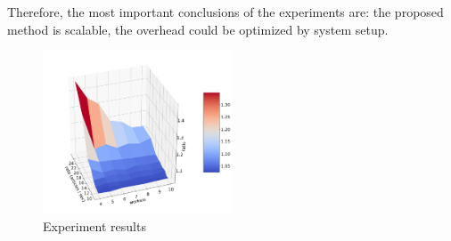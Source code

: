 Therefore, the most important conclusions of the experiments are: the proposed method is scalable, the overhead could be optimized by system setup.

\begin{figure}[htbp]
  \centering
  \includegraphics[width=0.5\textwidth]{pics/experiment}
  \caption{Experiment results}
  \label {experiment}
\end{figure}
